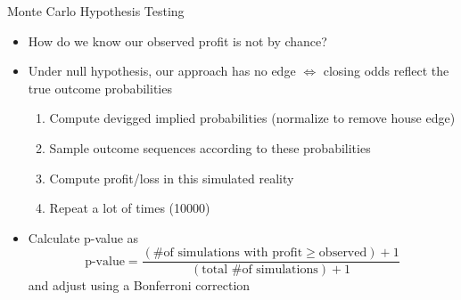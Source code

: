 \documentclass[aspectratio=169,xcolor=dvipsnames]{beamer}
\begin{document}
\begin{frame}{Monte Carlo Hypothesis Testing}
    \begin{itemize}
        \item How do we know our observed profit is not by chance?

        \item Under null hypothesis, our approach has no edge $\Longleftrightarrow$ closing odds reflect the true outcome probabilities
        \begin{enumerate}
            \item Compute devigged implied probabilities (normalize to remove house edge)

            \item Sample outcome sequences according to these probabilities

            \item Compute profit/loss in this simulated reality

            \item Repeat a lot of times (10000)
        \end{enumerate}

        \item Calculate p-value as
        $$\text{p-value} = \frac{(\text{\# of simulations with profit}\geq\text{observed}) + 1}{(\text{total \# of simulations}) + 1}$$
        and adjust using a Bonferroni correction
    \end{itemize}
\end{frame}

\end{document}
